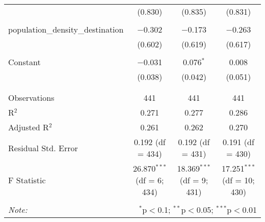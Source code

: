\begin{table}[!htbp]
\begin{tabular}{@{\extracolsep{5pt}}lccc}
  & (0.830) & (0.835) & (0.831) \\ 
  & & & \\ 
 population\_density\_destination & $-$0.302 & $-$0.173 & $-$0.263 \\ 
  & (0.602) & (0.619) & (0.617) \\ 
  & & & \\ 
 Constant & $-$0.031 & 0.076$^{*}$ & 0.008 \\ 
  & (0.038) & (0.042) & (0.051) \\ 
  & & & \\ 
\hline \\[-1.8ex] 
Observations & 441 & 441 & 441 \\ 
R$^{2}$ & 0.271 & 0.277 & 0.286 \\ 
Adjusted R$^{2}$ & 0.261 & 0.262 & 0.270 \\ 
Residual Std. Error & 0.192 (df = 434) & 0.192 (df = 431) & 0.191 (df = 430) \\ 
F Statistic & 26.870$^{***}$ (df = 6; 434) & 18.369$^{***}$ (df = 9; 431) & 17.251$^{***}$ (df = 10; 430) \\ 
\hline 
\hline \\[-1.8ex] 
\textit{Note:}  & \multicolumn{3}{r}{$^{*}$p$<$0.1; $^{**}$p$<$0.05; $^{***}$p$<$0.01} \\ 
\end{tabular} 
\end{table} 
